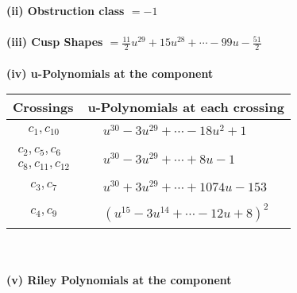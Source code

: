 \documentclass[1p]{elsarticle_modified}
\theoremstyle{definition}
\begin{document}
\flushleft \textbf{(ii) Obstruction class $= -1$}\\~\\
\flushleft \textbf{(iii) Cusp Shapes $= \frac{11}{2} u^{29}+15 u^{28}+\cdots-99 u-\frac{51}{2}$}\\~\\
\newpage\renewcommand{\arraystretch}{1}
\flushleft \textbf{(iv) u-Polynomials at the component}\newline \\
\begin{tabular}{m{50pt}|m{274pt}}
Crossings & \hspace{64pt}u-Polynomials at each crossing \\
\hline $$\begin{aligned}c_{1},c_{10}\end{aligned}$$&$\begin{aligned}
&u^{30}-3 u^{29}+\cdots-18 u^2+1
\end{aligned}$\\
\hline $$\begin{aligned}c_{2},c_{5},c_{6}\\c_{8},c_{11},c_{12}\end{aligned}$$&$\begin{aligned}
&u^{30}-3 u^{29}+\cdots+8 u-1
\end{aligned}$\\
\hline $$\begin{aligned}c_{3},c_{7}\end{aligned}$$&$\begin{aligned}
&u^{30}+3 u^{29}+\cdots+1074 u-153
\end{aligned}$\\
\hline $$\begin{aligned}c_{4},c_{9}\end{aligned}$$&$\begin{aligned}
&(u^{15}-3 u^{14}+\cdots-12 u+8)^{2}
\end{aligned}$\\
\hline
\end{tabular}\\~\\
\newpage\renewcommand{\arraystretch}{1}
\flushleft \textbf{(v) Riley Polynomials at the component}\newline \\
\end{document}
